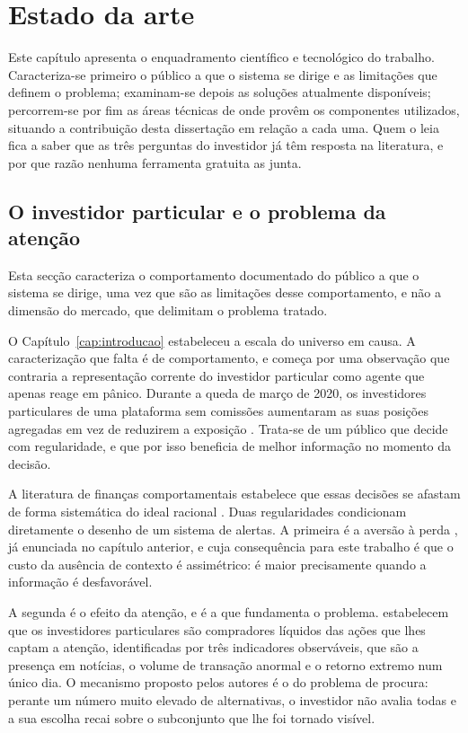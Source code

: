 \chapter{Estado da arte}
\label{cap:contexto}

Este capítulo apresenta o enquadramento científico e tecnológico do trabalho. Caracteriza-se
primeiro o público a que o sistema se dirige e as limitações que definem o problema; examinam-se
depois as soluções atualmente disponíveis; percorrem-se por fim as áreas técnicas de onde provêm
os componentes utilizados, situando a contribuição desta dissertação em relação a cada uma. Quem o leia fica a saber que as três perguntas do investidor já têm resposta na literatura, e por que razão nenhuma ferramenta gratuita as junta.

\section{O investidor particular e o problema da atenção}
\label{sec:ctx_investidor}

Esta secção caracteriza o comportamento documentado do público a que o sistema se dirige, uma vez
que são as limitações desse comportamento, e não a dimensão do mercado, que delimitam o problema
tratado.

O Capítulo~\ref{cap:introducao} estabeleceu a escala do universo em causa. A caracterização que
falta é de comportamento, e começa por uma observação que contraria a representação corrente do
investidor particular como agente que apenas reage em pânico. Durante a queda de março de 2020, os
investidores particulares de uma plataforma sem comissões aumentaram as suas posições agregadas em
vez de reduzirem a exposição \autocite{welch2022robinhood}. Trata-se de um público que decide com
regularidade, e que por isso beneficia de melhor informação no momento da decisão.

A literatura de finanças comportamentais estabelece que essas decisões se afastam de forma
sistemática do ideal racional \autocite{barberis2003behavioral}. Duas regularidades condicionam
diretamente o desenho de um sistema de alertas. A primeira é a aversão à perda
\autocite{kahneman1979prospect}, já enunciada no capítulo anterior, e cuja consequência para este
trabalho é que o custo da ausência de contexto é assimétrico: é maior precisamente quando a
informação é desfavorável.

A segunda é o efeito da atenção, e é a que fundamenta o problema. \textcite{barber2008glitters}
estabelecem que os investidores particulares são compradores líquidos das ações que lhes captam a
atenção, identificadas por três indicadores observáveis, que são a presença em notícias, o volume
de transação anormal e o retorno extremo num único dia. O mecanismo proposto pelos autores é o do
problema de procura: perante um número muito elevado de alternativas, o investidor não avalia todas
e a sua escolha recai sobre o subconjunto que lhe foi tornado visível.

